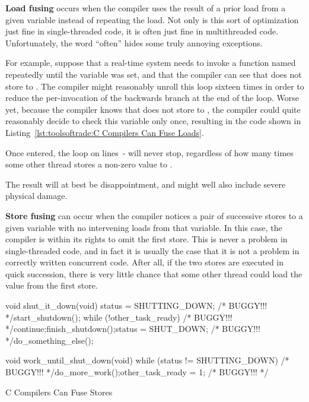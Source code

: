 {\bf Load fusing} occurs when the compiler uses the result of a
prior load from a given variable instead of repeating the load.
Not only is this sort of optimization just fine in single-threaded
code, it is often just fine in multithreaded code.
Unfortunately, the word ``often'' hides some truly annoying exceptions.

For example, suppose that a real-time system needs to invoke a
function named  repeatedly until the
variable  was set, and that the compiler can see
that  does not store to .
The compiler might reasonably unroll this loop sixteen times in order
to reduce the per-invocation of the backwards branch at the end of the
loop.
Worse yet, because the compiler knows that 
does not store to , the compiler could quite reasonably
decide to check this variable only once, resulting in the code shown in
Listing~\ref{lst:toolsoftrade:C Compilers Can Fuse Loads}.
\begin{lineref}
Once entered, the loop on
lines~- will never stop, regardless of how
many times some other thread stores a non-zero value to .
\end{lineref}
The result will at best be disappointment, and might well also
include severe physical damage.

{\bf Store fusing} can occur when the compiler notices a pair of successive
stores to a given variable with no intervening loads from that variable.
In this case, the compiler is within its rights to omit the first store.
This is never a problem in single-threaded code, and in fact it is usually
the case that it is not a problem in correctly written concurrent code.
After all, if the two stores are executed in quick succession, there is
very little chance that some other thread could load the value from the
first store.

\begin{listing}[tbp]
\begin{linelabel}
\begin{VerbatimL}[commandchars=\\\[\]]
void shut_it_down(void)
{
	status = SHUTTING_DOWN; /* BUGGY!!! */\lnlbl[store:a]
	start_shutdown();
	while (!other_task_ready) /* BUGGY!!! */\lnlbl[loop:b]
		continue;\lnlbl[loop:e]
	finish_shutdown();\lnlbl[finish]
	status = SHUT_DOWN; /* BUGGY!!! */\lnlbl[store:b]
	do_something_else();
}

void work_until_shut_down(void)
{
	while (status != SHUTTING_DOWN) /* BUGGY!!! */
		do_more_work();
	other_task_ready = 1; /* BUGGY!!! */
}
\end{VerbatimL}
\end{linelabel}
\caption{C Compilers Can Fuse Stores}
\label{lst:toolsoftrade:C Compilers Can Fuse Stores}
\end{listing}

